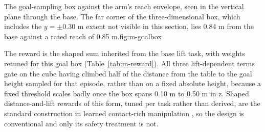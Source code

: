 \begin{kuetfigure}{The goal-sampling box against the arm's reach envelope, seen in the vertical
plane through the base. The far corner of the three-dimensional box, which includes the
\(y=\pm0.30\) m extent not visible in this section, lies 0.84 m from the base against a rated reach
of 0.85 m.}{fig:m-goalbox}
\end{kuetfigure}

The reward is the shaped sum inherited from the base lift task, with weights retuned for this goal
box (Table~\ref{tab:m-reward}). All three lift-dependent terms gate on the cube having climbed half
of the distance from the table to the goal height sampled for that episode, rather than on a fixed
absolute height, because a fixed threshold scales badly once the box spans 0.10 m to 0.50 m in z.
Shaped distance-and-lift rewards of this form, tuned per task rather than derived, are the standard
construction in learned contact-rich manipulation \cite{elguea2023review}, so the design is
conventional and only its safety treatment is not.


